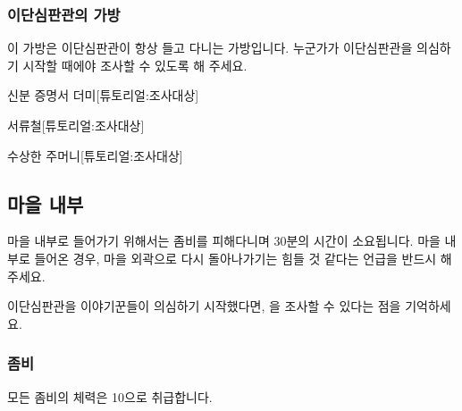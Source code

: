 \documentclass{report}
\begin{document}
				\hypertarget{search:rogue-bag}{}
				\subsubsection*{이단심판관의 가방}
					이 가방은 이단심판관이 항상 들고 다니는 가방입니다. 누군가가 이단심판관을 의심하기 시작할 때에야 조사할 수 있도록 해 주세요.
					
					\begin{spoiler}{신분 증명서 더미}{[튜토리얼:조사대상]}
					\end{spoiler}
					
					\begin{spoiler}{서류철}{[튜토리얼:조사대상]}
						
						
					\end{spoiler}
					
					\begin{spoiler}{수상한 주머니}{[튜토리얼:조사대상]}
						
					\end{spoiler}
				
			\subsection{마을 내부}
				마을 내부로 들어가기 위해서는 좀비를 피해다니며 30분의 시간이 소요됩니다. 마을 내부로 들어온 경우, 마을 외곽으로 다시 돌아나가기는 힘들 것 같다는 언급을 반드시 해주세요.
				
				이단심판관을 이야기꾼들이 의심하기 시작했다면, 을 조사할 수 있다는 점을 기억하세요.
				
				\hypertarget{search:zombie}{}
				\subsubsection*{좀비}
					모든 좀비의 체력은 10으로 취급합니다.
					
\end{document}
